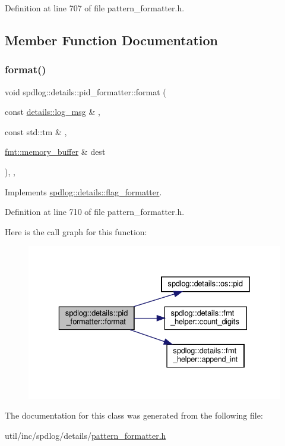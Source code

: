 Definition at line 707 of file pattern\+\_\+formatter.\+h.



\subsection{Member Function Documentation}
\mbox{\label{classspdlog_1_1details_1_1pid__formatter_abe690b2f66b9046e40931bae634779d5}} 
\subsubsection{\texorpdfstring{format()}{format()}}
{\footnotesize\ttfamily void spdlog\+::details\+::pid\+\_\+formatter\+::format (\begin{DoxyParamCaption}\item[{const \hyperlink{structspdlog_1_1details_1_1log__msg}{details\+::log\+\_\+msg} \&}]{,  }\item[{const std\+::tm \&}]{,  }\item[{\hyperlink{format_8h_a21cbf729f69302f578e6db21c5e9e0d2}{fmt\+::memory\+\_\+buffer} \&}]{dest }\end{DoxyParamCaption})\hspace{0.3cm}{\ttfamily [inline]}, {\ttfamily [override]}, {\ttfamily [virtual]}}



Implements \hyperlink{classspdlog_1_1details_1_1flag__formatter_a33fb3e42a4c8200cceb833d92b53fb67}{spdlog\+::details\+::flag\+\_\+formatter}.



Definition at line 710 of file pattern\+\_\+formatter.\+h.

Here is the call graph for this function\+:
\nopagebreak
\begin{figure}[H]
\begin{center}
\leavevmode
\includegraphics[width=329pt]{classspdlog_1_1details_1_1pid__formatter_abe690b2f66b9046e40931bae634779d5_cgraph}
\end{center}
\end{figure}


The documentation for this class was generated from the following file\+:\begin{DoxyCompactItemize}
\item 
util/inc/spdlog/details/\hyperlink{pattern__formatter_8h}{pattern\+\_\+formatter.\+h}\end{DoxyCompactItemize}
